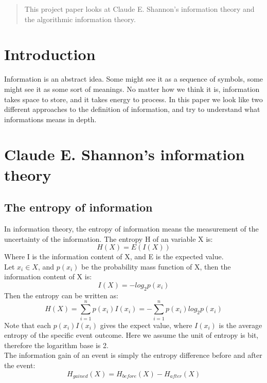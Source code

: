 \documentclass[12pt]{article}
\begin{document}
\maketitle

\begin{abstract}
This project paper looks at Claude E. Shannon's information theory and the algorithmic information theory.
\end{abstract}

\section{Introduction}
Information is an abstract idea. Some might see it as a sequence of symbols, some might see it as some sort of meanings. No matter how we think it is, information takes space to store, and it takes energy to process. In this paper we look like two different approaches to the definition of information, and try to understand what informations means in depth.

\section{Claude E. Shannon's information theory}

\subsection{The entropy of information}
In information theory, the entropy of information means the measurement of the uncertainty of the information. The entropy H of an variable X is:
\[
	H(X) = E(I(X))
\]
Where I is the information content of X, and E is the expected value.\\
Let $x_i \in X$, and $p(x_i)$ be the probability mass function of X, then the information content of X is:
\[
	I(X) = -log_{2}p(x_i)
\]
Then the entropy can be written as\cite{reza94}:
\[
	H(X) = \sum_{i=1}^{n}p(x_i)I(x_i) = -\sum_{i=1}^{n}p(x_i)log_{2}p(x_i)
\]
Note that each $p(x_i)I(x_i)$ gives the expect value, where $I(x_i)$ is the average entropy of the specific event outcome. Here we assume the unit of entropy is bit, therefore the logarithm base is 2.\\

The information gain of an event is simply the entropy difference before and after the event:
\[
	H_{gained}(X) = H_{before}(X) - H_{after}(X)
\]
\end{document}
